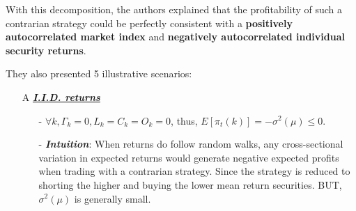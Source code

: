 With this decomposition, the authors explained that the profitability of such a contrarian strategy could be perfectly
consistent with a \textbf{positively autocorrelated market index} and \textbf{negatively autocorrelated individual security returns}.

They also presented 5 illustrative scenarios:
\begin{enumerate}
    \item[A] \underline{\textbf{\textit{I.I.D. returns}}}
    \begin{enumerate}
        \item[-] $\forall k, \Gamma_k=0, L_k=C_k=O_k=0$, thus, $E[\pi_t(k)]=-\sigma^2(\mu)\leq 0$. 
        \item[-] \textit{\textbf{Intuition}}: When returns do follow random walks, any cross-sectional 
        variation in expected returns would generate negative expected profits when trading with a contrarian strategy. 
        Since the strategy is reduced to shorting the higher and buying the lower mean return securities. BUT, $\sigma^2(\mu)$ is generally small.
    \end{enumerate}


\end{enumerate}

